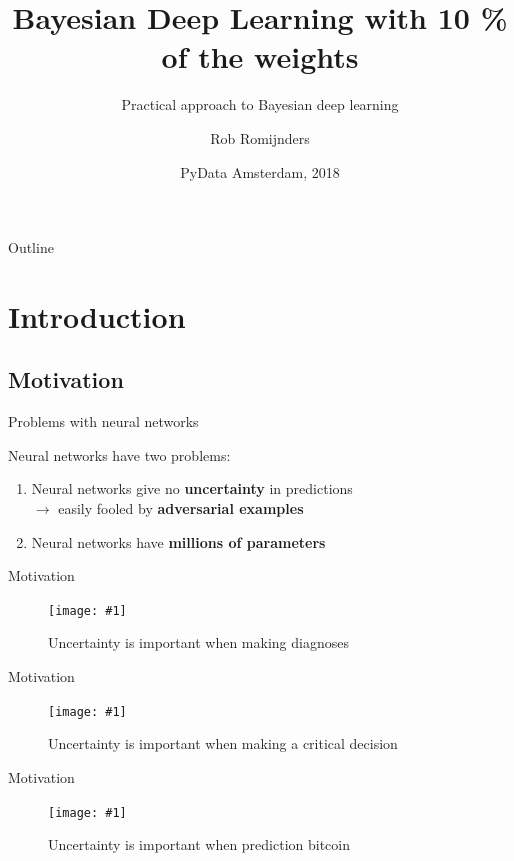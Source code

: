 \documentclass{beamer}
\title{Bayesian Deep Learning with 10 \% of the weights}
\subtitle{Practical approach to Bayesian deep learning}
\author{Rob Romijnders}
\institute[Universities of Somewhere and Elsewhere] %
{
  \mdlink{robromijnders.github.io}{http://robromijnders.github.io/}}
\date{PyData Amsterdam, 2018}
\newcommand{\fitfigure}[1]{\centering\texttt{[image: \#1]}}
\begin{document}
\begin{frame}
	\titlepage
\end{frame}

\begin{frame}{Outline}
	\tableofcontents
\end{frame}

\section{Introduction}

\subsection{Motivation}

\begin{frame}{Problems with neural networks}
	\centerline{Neural networks have two problems:}
	\centerline{  }
	\begin{enumerate}
		\item Neural networks give no \textbf{uncertainty} in predictions \\ 
		      \quad \quad \small{ $\rightarrow$ easily fooled by \textbf{adversarial examples}}
		\item Neural networks have \textbf{millions of parameters}
	\end{enumerate}
\end{frame}

\begin{frame}{Motivation}
	\begin{figure}
		\fitfigure{im/xray.png}
		\caption{Uncertainty is important when making diagnoses}
	\end{figure}
\end{frame}

\begin{frame}{Motivation}
	\begin{figure}
		\fitfigure{im/autonomous_driving.jpg}
		\caption{Uncertainty is important when making a critical decision}
	\end{figure}
\end{frame}

\begin{frame}{Motivation}
	\begin{figure}
		\fitfigure{im/bitcoin.png}
		\caption{Uncertainty is important when prediction bitcoin}
	\end{figure}
\end{frame}
\end{document}
